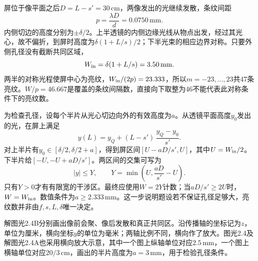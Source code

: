 \documentclass[UTF8,fontset=fandol,a4paper,11pt]{ctexart}
\begin{document}
屏位于像平面之后$D=L-s'=30\,\mathrm{cm}$，两像发出的光继续发散，条纹间距
\[
\boxed{p=\frac{\lambda D}{d}=0.0750\,\mathrm{mm}}.
\]
内侧切边的高度分别为$\pm\delta/2$。上半透镜的内侧边缘光线从物点出发，经过其光心，故不偏折，到屏时高度为$\delta(1+L/s)/2$；下半光束的相应边界对称。只要外侧孔径没有截断共同区域，
\[
W_{\rm in}=\delta(1+L/s)=3.50\,\mathrm{mm}.
\]
两半的对称光程使屏中心为亮纹，$W_{\rm in}/(2p)=23.333$，所以$m=-23,\ldots,23$共47条亮纹。$W/p=46.667$是覆盖的条纹间隔数，直接向下取整为46不能代表此对称条件下的亮纹数。

为检查孔径，设每个半片从光心切边向外的有效高度为$a$。从透镜平面高度$y_0$发出的光，在屏上满足
\[
y(L)=y_Q+(L-s')\,\frac{y_Q-y_0}{s'}.
\]
对上半片有$y_0\in[\delta/2,\delta/2+a]$，得到屏区间$[U-aD/s',U]$，其中$U=W_{\rm in}/2$。下半片给$[-U,-U+aD/s']$。两区间的交集可写为
\[
|y|\le Y,\qquad
Y=\min\!\left(U,\frac{aD}{s'}-U\right).
\]
只有$Y>0$才有有限宽的干涉区。最终应使用$W=2Y$计数；当$aD/s'\ge2U$时，$W=W_{\rm in}$。数值条件为$a\ge2.333\,\mathrm{mm}$。这一步说明题设若不保证孔径足够大，亮纹数并非由$f,s,L,\delta$唯一决定。

解图光2.4B分别画出像前会聚、像后发散和真正共同区。沿传播轴的坐标记为$z$，单位为厘米，横向坐标$y$的单位为毫米；两轴比例不同，横向作了放大。图光2.4及解图光2.4A也采用横向放大示意，其中一个图上纵轴单位对应$2.5\,\mathrm{mm}$，一个图上横轴单位对应$20/3\,\mathrm{cm}$，画出的半片高度为$a=3\,\mathrm{mm}$，用于检验孔径条件。
\end{document}
